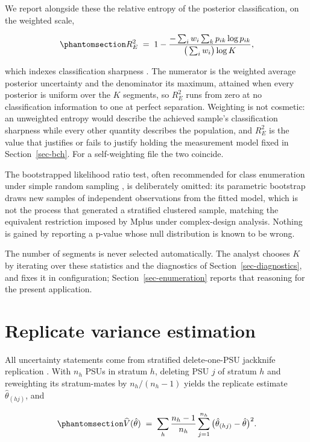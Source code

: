 \documentclass[
  12pt]{article}
\begin{document}
We report alongside these the relative entropy of the posterior
classification, on the weighted scale,

\begin{equation}\phantomsection\label{eq-entropy}{
R^2_E \;=\; 1 - \frac{-\sum_{i} w_i \sum_{k} p_{ik} \log p_{ik}}
{\big(\sum_i w_i\big) \log K},
}\end{equation}

which indexes classification sharpness \citep{ramaswamy1993}. The
numerator is the weighted average posterior uncertainty and the
denominator its maximum, attained when every posterior is uniform over
the \(K\) segments, so \(R^2_E\) runs from zero at no classification
information to one at perfect separation. Weighting is not cosmetic: an
unweighted entropy would describe the achieved sample's classification
sharpness while every other quantity describes the population, and
\(R^2_E\) is the value that justifies or fails to justify holding the
measurement model fixed in Section~\ref{sec-bch}. For a self-weighting
file the two coincide.

The bootstrapped likelihood ratio test, often recommended for class
enumeration under simple random sampling \citep{nylund2007}, is
deliberately omitted: its parametric bootstrap draws new samples of
independent observations from the fitted model, which is not the process
that generated a stratified clustered sample, matching the equivalent
restriction imposed by Mplus under complex-design analysis. Nothing is
gained by reporting a p-value whose null distribution is known to be
wrong.

The number of segments is never selected automatically. The analyst
chooses \(K\) by iterating over these statistics and the diagnostics of
Section~\ref{sec-diagnostics}, and fixes it in configuration;
Section~\ref{sec-enumeration} reports that reasoning for the present
application.

\section{Replicate variance estimation}\label{sec-variance}

All uncertainty statements come from stratified delete-one-PSU jackknife
replication \citep{wolter2007, rust1996, lumley2004}. With \(n_h\) PSUs
in stratum \(h\), deleting PSU \(j\) of stratum \(h\) and reweighting
its stratum-mates by \(n_h/(n_h - 1)\) yields the replicate estimate
\(\hat\theta_{(hj)}\), and

\begin{equation}\phantomsection\label{eq-jkn}{
\widehat{V}(\hat\theta) \;=\; \sum_{h} \frac{n_h - 1}{n_h}
\sum_{j=1}^{n_h} \big( \hat\theta_{(hj)} - \hat\theta \big)^2 .
}\end{equation}
\end{document}
